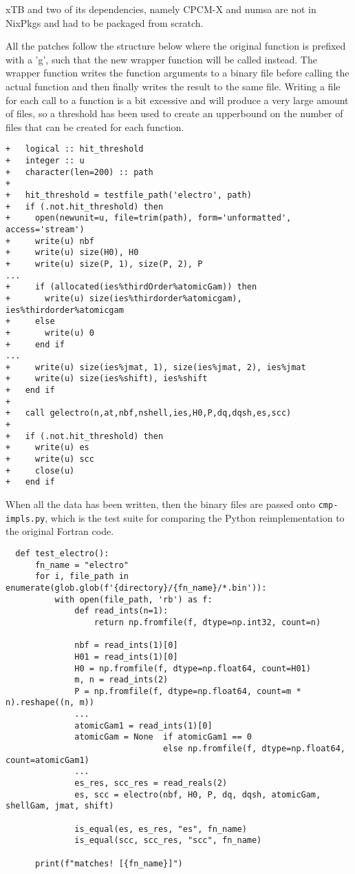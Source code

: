 xTB and two of its dependencies, namely CPCM-X and numsa are not in NixPkgs and had to be packaged from scratch.

All the patches follow the structure below where the original function is prefixed with a 'g', such that the new wrapper function will be called instead. The wrapper function writes the function arguments to a binary file before calling the actual function and then finally writes the result to the same file.
Writing a file for each call to a function is a bit excessive and will produce a very large amount of files, so a threshold has been used to create an upperbound on the number of files that can be created for each function.

\begin{verbatim}
+   logical :: hit_threshold
+   integer :: u
+   character(len=200) :: path
+
+   hit_threshold = testfile_path('electro', path)
+   if (.not.hit_threshold) then
+     open(newunit=u, file=trim(path), form='unformatted', access='stream')
+     write(u) nbf
+     write(u) size(H0), H0
+     write(u) size(P, 1), size(P, 2), P
...
+     if (allocated(ies%thirdOrder%atomicGam)) then
+       write(u) size(ies%thirdorder%atomicgam), ies%thirdorder%atomicgam
+     else
+       write(u) 0
+     end if
...
+     write(u) size(ies%jmat, 1), size(ies%jmat, 2), ies%jmat
+     write(u) size(ies%shift), ies%shift
+   end if
+
+   call gelectro(n,at,nbf,nshell,ies,H0,P,dq,dqsh,es,scc)
+
+   if (.not.hit_threshold) then
+     write(u) es
+     write(u) scc
+     close(u)
+   end if
\end{verbatim}

When all the data has been written, then the binary files are passed onto \verb|cmp-impls.py|, which is the test suite for comparing the Python reimplementation to the original Fortran code. 

\begin{verbatim}
  def test_electro():
      fn_name = "electro"
      for i, file_path in enumerate(glob.glob(f'{directory}/{fn_name}/*.bin')):
          with open(file_path, 'rb') as f:
              def read_ints(n=1):
                  return np.fromfile(f, dtype=np.int32, count=n)

              nbf = read_ints(1)[0]
              H01 = read_ints(1)[0]
              H0 = np.fromfile(f, dtype=np.float64, count=H01)
              m, n = read_ints(2)
              P = np.fromfile(f, dtype=np.float64, count=m * n).reshape((n, m))
              ...
              atomicGam1 = read_ints(1)[0]
              atomicGam = None  if atomicGam1 == 0
                                else np.fromfile(f, dtype=np.float64, count=atomicGam1)
              ...
              es_res, scc_res = read_reals(2)
              es, scc = electro(nbf, H0, P, dq, dqsh, atomicGam, shellGam, jmat, shift)

              is_equal(es, es_res, "es", fn_name)
              is_equal(scc, scc_res, "scc", fn_name)

      print(f"matches! [{fn_name}]")
\end{verbatim}
